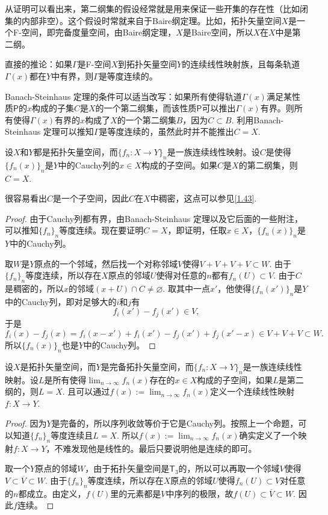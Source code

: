 从证明可以看出来，第二纲集的假设经常就是用来保证一些开集的存在性（比如闭集的内部非空）。这个假设时常就来自于Baire纲定理。比如，拓扑矢量空间$X$是一个F-空间，即完备度量空间，由Baire纲定理，$X$是Baire空间，所以$X$在$X$中是第二纲。

直接的推论：如果$\Gamma$是F-空间$X$到拓扑矢量空间$Y$的连续线性映射族，且每条轨道$\Gamma(x)$都在$Y$中有界，则$\Gamma$是等度连续的。

Banach-Steinhaus 定理的条件可以适当改写：如果所有使得轨道$\Gamma(x)$满足某性质$\mathsf{P}$的$x$构成的子集$C$是$X$的一个第二纲集，而该性质$\mathsf{P}$可以推出$\Gamma(x)$有界。则所有使得$\Gamma(x)$有界的$x$构成了$X$的一个第二纲集$B$，因为$C\subset B$. 利用Banach-Steinhaus 定理可以推知$\Gamma$是等度连续的，虽然此时并不能推出$C=X$.

\begin{pro}
	设$X$和$Y$都是拓扑矢量空间，而$\{f_n:X\to Y\}_n$是一族连续线性映射。设$C$是使得$\{f_n(x)\}_n$是$Y$中的Cauchy列的$x\in X$构成的子空间。如果$C$是$X$的第二纲集，则$C=X$.
\end{pro}

很容易看出$C$是一个子空间，因此$C$在$X$中稠密，这点可以参见\ref{1.43}.

\begin{proof}
	由于Cauchy列都有界，由Banach-Steinhaus 定理以及它后面的一些附注，可以推知$\{f_n\}_n$等度连续。现在要证明$C=X$，即证明，任取$x\in X$，$\{f_n(x)\}_n$是$Y$中的Cauchy列。

	取$W$是$Y$原点的一个邻域，然后找一个对称邻域$V$使得$V+V+V+V\subset W$. 由于$\{f_n\}_n$等度连续，所以存在$X$原点的邻域$U$使得对任意的$n$都有$f_n(U)\subset V$. 由于$C$是稠密的，所以$x$的邻域$(x+U)\cap C\neq \varnothing$. 取其中一点$x'$，他使得$\{f_n(x')\}_n$是$Y$中的Cauchy列，即对足够大的$i$和$j$有
	\[
	f_i(x')-f_j(x')\in V,
	\]
	于是
	\[
	f_i(x)-f_j(x)=f_i(x-x')+f_i(x')-f_j(x')+f_j(x'-x)\in V+V+V\subset W.
	\]
	所以$\{f_n(x)\}_n$也是$Y$中的Cauchy列。
\end{proof}

\begin{thm}
设$X$是拓扑矢量空间，而$Y$是完备拓扑矢量空间，而$\{f_n:X\to Y\}_n$是一族连续线性映射。设$L$是所有使得$\lim_{n\to \infty}f_n(x)$存在的$x\in X$构成的子空间，如果$L$是第二纲的，则$L=X$. 且可以通过$f(x):=\lim_{n\to \infty}f_n(x)$定义一个连续线性映射$f:X\to Y$.
\end{thm}

\begin{proof}
因为$Y$是完备的，所以序列收敛等价于它是Cauchy列。按照上一个命题，可以知道$\{f_n\}_n$等度连续且$L=X$. 所以$f(x):=\lim_{n\to \infty}f_n(x)$确实定义了一个映射$f:X\to Y$，不难发现他是线性的。最后只要说明他是连续的即可。

取一个$Y$原点的邻域$W$，由于拓扑矢量空间是$\mathsf{T}_3$的，所以可以再取一个邻域$V$使得$V\subset \overline{V}\subset W$. 由于$\{f_n\}_n$等度连续，所以存在$X$原点的邻域$U$使得$f_n(U)\subset V$对任意的$n$都成立。由定义，$f(U)$里的元素都是$V$中序列的极限，故$f(U)\subset \overline{V}\subset W$. 因此$f$连续。
\end{proof}

